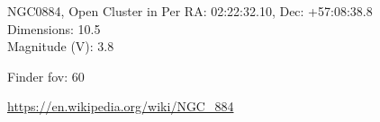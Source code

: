 \begin{block}{NGC0884, Open Cluster in Per}
    RA: 02:22:32.10, Dec: +57:08:38.8 \\ 
    Dimensions: 10.5 \\ 
    Magnitude (V): 3.8



    Finder fov: 60 

    \url{https://en.wikipedia.org/wiki/NGC_884} 
\end{block}